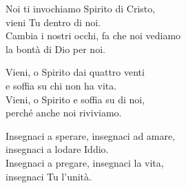 

\spazio

\strofa Noi ti invochiamo Spirito di Cristo,\\
vieni Tu dentro di noi.\\
Cambia i nostri occhi, fa che noi vediamo\\
la bontà di Dio per noi.

\spazio


\spazio

\strofa Vieni, o Spirito dai quattro venti\\
e soffia su chi non ha vita.\\
Vieni, o Spirito e soffia su di noi,\\
perché anche noi riviviamo.

\spazio


\spazio

\strofa Insegnaci a sperare, insegnaci ad amare,\\
insegnaci a lodare Iddio.\\
Insegnaci a pregare, insegnaci la vita,\\
insegnaci Tu l'unità.

\spazio

